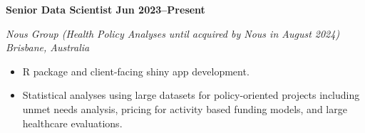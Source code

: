 \textbf{Senior Data Scientist \hfill Jun 2023--Present}\par
\textit{Nous Group (Health Policy Analyses until acquired by Nous in August 2024) \hfill Brisbane, Australia}\par
\begin{itemize}
	\item R package and client-facing shiny app development.
	\item Statistical analyses using large datasets for policy-oriented projects including unmet needs analysis, pricing for activity based funding models, and large healthcare evaluations.
\end{itemize}\par